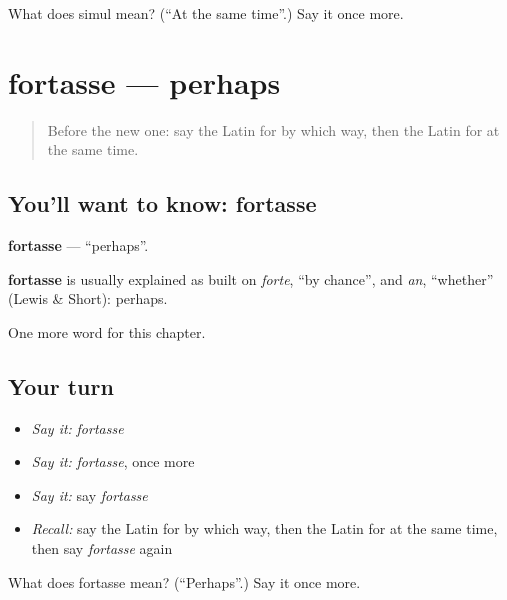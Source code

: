 \begin{tcolorbox}[breakable,colback=teal!4,colframe=teal!35!black,title={Before you move on}]
What does simul mean? (\textquotedblleft{}At the same time\textquotedblright{}.) Say it once more.
\end{tcolorbox}
\section[fortasse]{fortasse — perhaps}

\label{lesson:LA-C239-fortasse}



\begin{quote}
Before the new one: say the Latin for by which way, then the Latin for at the same time.
\end{quote}

\subsection*{You'll want to know: fortasse}
\textbf{fortasse} — \textquotedblleft{}perhaps\textquotedblright{}.

\begin{cousinweb}
\textbf{fortasse} is usually explained as built on \emph{forte}, \textquotedblleft{}by chance\textquotedblright{}, and \emph{an}, \textquotedblleft{}whether\textquotedblright{} (Lewis \& Short): perhaps.
\end{cousinweb}

\begin{grammarlens}[title={What you've built}]
One more word for this chapter.
\end{grammarlens}

\subsection*{Your turn}
\begin{itemize}
\raggedright
  \item \emph{Say it:} \emph{fortasse}
  \item \emph{Say it:} \emph{fortasse}, once more
  \item \emph{Say it:} say \emph{fortasse}
  \item \emph{Recall:} say the Latin for by which way, then the Latin for at the same time, then say \emph{fortasse} again
\end{itemize}

\begin{tcolorbox}[breakable,colback=teal!4,colframe=teal!35!black,title={Before you move on}]
What does fortasse mean? (\textquotedblleft{}Perhaps\textquotedblright{}.) Say it once more.
\end{tcolorbox}
